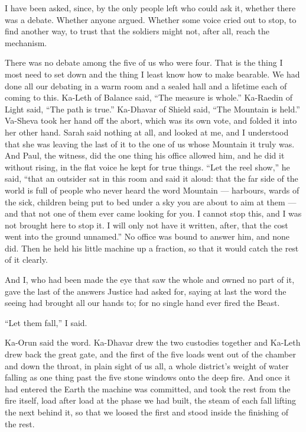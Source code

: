 I have been asked, since, by the only people left who could ask it, whether there was a debate. Whether anyone argued. Whether some voice cried out to stop, to find another way, to trust that the soldiers might not, after all, reach the mechanism.\par

There was no debate among the five of us who were four. That is the thing I most need to set down and the thing I least know how to make bearable. We had done all our debating in a warm room and a sealed hall and a lifetime each of coming to this. Ka-Leth of Balance said, ``The measure is whole.'' Ka-Raedin of Light said, ``The path is true.'' Ka-Dhavar of Shield said, ``The Mountain is held.'' Va-Sheva took her hand off the abort, which was its own vote, and folded it into her other hand. Sarah said nothing at all, and looked at me, and I understood that she was leaving the last of it to the one of us whose Mountain it truly was. And Paul, the witness, did the one thing his office allowed him, and he did it without rising, in the flat voice he kept for true things. ``Let the reel show,'' he said, ``that an outsider sat in this room and said it aloud: that the far side of the world is full of people who never heard the word Mountain --- harbours, wards of the sick, children being put to bed under a sky you are about to aim at them --- and that not one of them ever came looking for you. I cannot stop this, and I was not brought here to stop it. I will only not have it written, after, that the cost went into the ground unnamed.'' No office was bound to answer him, and none did. Then he held his little machine up a fraction, so that it would catch the rest of it clearly.\par

And I, who had been made the eye that saw the whole and owned no part of it, gave the last of the answers Justice had asked for, saying at last the word the seeing had brought all our hands to; for no single hand ever fired the Beast.\par

``Let them fall,'' I said.\par

Ka-Orun said the word. Ka-Dhavar drew the two custodies together and Ka-Leth drew back the great gate, and the first of the five loads went out of the chamber and down the throat, in plain sight of us all, a whole district's weight of water falling as one thing past the five stone windows onto the deep fire. And once it had entered the Earth the machine was committed, and took the rest from the fire itself, load after load at the phase we had built, the steam of each fall lifting the next behind it, so that we loosed the first and stood inside the finishing of the rest.\par

